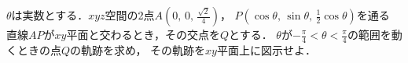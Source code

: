 \documentclass[../../main.tex]{subfiles}
\begin{document}
$\theta$は実数とする．$xyz$空間の2点$\displaystyle A \left( 0, \, 0, \, \frac{\sqrt2}{4} \right)$，
$\displaystyle P \left( \cos\theta, \, \sin\theta, \, \frac{1}{2}\cos\theta \right)$を通る
直線$AP$が$xy$平面と交わるとき，その交点を$Q$とする．
$\theta$が$\displaystyle -\frac{\pi}{4}<\theta<\frac{\pi}{4}$の範囲を動くときの点$Q$の軌跡を求め，
その軌跡を$xy$平面上に図示せよ．
\end{document}
